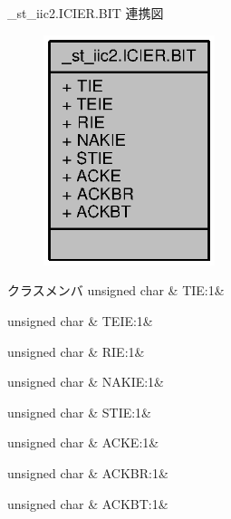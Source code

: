 \+\_\+st\+\_\+iic2.\+I\+C\+I\+E\+R.\+B\+I\+T 連携図
\nopagebreak
\begin{figure}[H]
\begin{center}
\leavevmode
\includegraphics[width=142pt]{db/dca/struct__st__iic2_8ICIER_8BIT__coll__graph}
\end{center}
\end{figure}
\begin{DoxyFields}{クラスメンバ}
unsigned char\label{3694s_8h_a8eb6c56ba51924a4cf185ec29e22be22}
&
T\+I\+E\+:1&
\\
\hline

unsigned char\label{3694s_8h_ab89346c173959f39be466817e44ef2b6}
&
T\+E\+I\+E\+:1&
\\
\hline

unsigned char\label{3694s_8h_a73cf42509991cff6949aa0431ce86b00}
&
R\+I\+E\+:1&
\\
\hline

unsigned char\label{3694s_8h_a339912117c32b4f3605c1bcab4b28856}
&
N\+A\+K\+I\+E\+:1&
\\
\hline

unsigned char\label{3694s_8h_aa3a5318d9a16f2e97f0e71429d62b978}
&
S\+T\+I\+E\+:1&
\\
\hline

unsigned char\label{3694s_8h_a2dc2fe205282923eaa6fa6c52659817b}
&
A\+C\+K\+E\+:1&
\\
\hline

unsigned char\label{3694s_8h_a63a704909c059921762cabd35bcc9181}
&
A\+C\+K\+B\+R\+:1&
\\
\hline

unsigned char\label{3694s_8h_afe6b4e5ab76c4a51f38798131ab0d884}
&
A\+C\+K\+B\+T\+:1&
\\
\hline

\end{DoxyFields}
\label{union__st__iic2_8ICSR}
